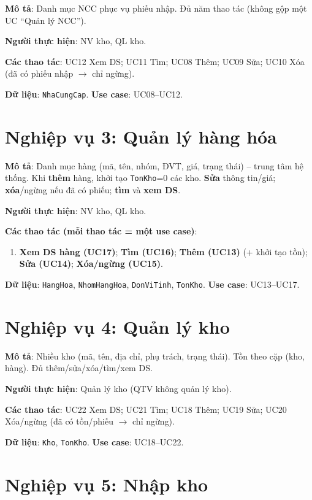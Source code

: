 \textbf{Mô tả}: Danh mục NCC phục vụ phiếu nhập. Đủ năm thao tác (không gộp một UC ``Quản lý NCC'').

\textbf{Người thực hiện}: NV kho, QL kho.

\textbf{Các thao tác}: UC12 Xem DS; UC11 Tìm; UC08 Thêm; UC09 Sửa; UC10 Xóa (đã có phiếu nhập $\rightarrow$ chỉ ngừng).

\textbf{Dữ liệu}: \texttt{NhaCungCap}. \textbf{Use case}: UC08--UC12.

\section{Nghiệp vụ 3: Quản lý hàng hóa}

\textbf{Mô tả}: Danh mục hàng (mã, tên, nhóm, ĐVT, giá, trạng thái) -- trung tâm hệ thống. Khi \textbf{thêm} hàng, khởi tạo \texttt{TonKho}=0 các kho. \textbf{Sửa} thông tin/giá; \textbf{xóa}/ngừng nếu đã có phiếu; \textbf{tìm} và \textbf{xem DS}.

\textbf{Người thực hiện}: NV kho, QL kho.

\textbf{Các thao tác (mỗi thao tác = một use case)}:
\begin{enumerate}[leftmargin=1.5cm]
    \item \textbf{Xem DS hàng (UC17)}; \textbf{Tìm (UC16)}; \textbf{Thêm (UC13)} (+ khởi tạo tồn); \textbf{Sửa (UC14)}; \textbf{Xóa/ngừng (UC15)}.
\end{enumerate}

\textbf{Dữ liệu}: \texttt{HangHoa}, \texttt{NhomHangHoa}, \texttt{DonViTinh}, \texttt{TonKho}. \textbf{Use case}: UC13--UC17.

\section{Nghiệp vụ 4: Quản lý kho}

\textbf{Mô tả}: Nhiều kho (mã, tên, địa chỉ, phụ trách, trạng thái). Tồn theo cặp (kho, hàng). Đủ thêm/sửa/xóa/tìm/xem DS.

\textbf{Người thực hiện}: Quản lý kho (QTV không quản lý kho).

\textbf{Các thao tác}: UC22 Xem DS; UC21 Tìm; UC18 Thêm; UC19 Sửa; UC20 Xóa/ngừng (đã có tồn/phiếu $\rightarrow$ chỉ ngừng).

\textbf{Dữ liệu}: \texttt{Kho}, \texttt{TonKho}. \textbf{Use case}: UC18--UC22.

\section{Nghiệp vụ 5: Nhập kho}


